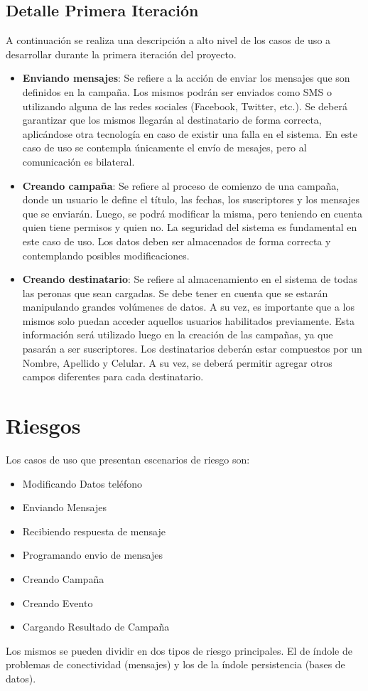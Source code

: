 \documentclass[a4paper, 11pt]{article}
\begin{document}
\subsection{Detalle Primera Iteración}
A continuación se realiza una descripción a alto nivel de los casos de uso a desarrollar durante la primera iteración del proyecto. 
\begin{itemize}
\item \textbf{Enviando mensajes}: Se refiere a la acción de enviar los mensajes que son definidos en la campaña. Los mismos podrán ser enviados como SMS o utilizando alguna de las redes sociales (Facebook, Twitter, etc.). Se deberá garantizar que los mismos llegarán al destinatario de forma correcta, aplicándose otra tecnología en caso de existir una falla en el sistema. En este caso de uso se contempla únicamente el envío de mesajes, pero al comunicación es bilateral. 
\item \textbf{Creando campaña}: Se refiere al proceso de comienzo de una campaña, donde un usuario le define el título, las fechas, los suscriptores y los mensajes que se enviarán. Luego, se podrá modificar la misma, pero teniendo en cuenta quien tiene permisos y quien no. La seguridad del sistema es fundamental en este caso de uso. Los datos deben ser almacenados de forma correcta y contemplando posibles modificaciones. 
\item \textbf{Creando destinatario}: Se refiere al almacenamiento en el sistema de todas las peronas que sean cargadas. Se debe tener en cuenta que se estarán manipulando grandes volúmenes de datos. A su vez, es importante que a los mismos solo puedan acceder aquellos usuarios habilitados previamente. Esta información será utilizado luego en la creación de las campañas, ya que pasarán a ser suscriptores. Los destinatarios deberán estar compuestos por un Nombre, Apellido y Celular. A su vez, se deberá permitir agregar otros campos diferentes para cada destinatario. 
\end{itemize}

\newpage
\section{Riesgos}

Los casos de uso que presentan escenarios de riesgo son:
\begin{itemize}
\item Modificando Datos teléfono
\item Enviando Mensajes
\item Recibiendo respuesta de mensaje
\item Programando envio de mensajes
\item Creando Campaña
\item Creando Evento
\item Cargando Resultado de Campaña
\end{itemize}
Los mismos se pueden dividir en dos tipos de riesgo principales. El de índole de problemas de conectividad (mensajes) y los de la índole persistencia (bases de datos).
\end{document}
